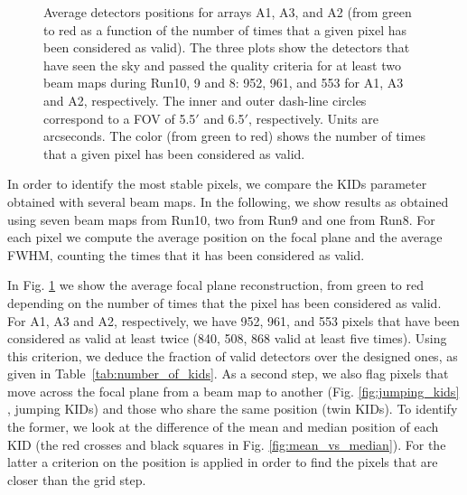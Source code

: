 \begin{figure}[p]
\begin{center}
\caption[KID selection]{Average detectors positions for arrays A1, A3, and A2 (from
  green to red as a function of the number of times that a given pixel
  has been considered as valid). The three plots show the detectors
  that have seen the sky and passed the quality criteria for at least
  two beam maps during Run10, 9 and 8: 952, 961, and 553
  for A1, A3 and A2, respectively. The inner and outer dash-line circles correspond to a 
  FOV of 5.5$\prime$ and 6.5$\prime$, respectively. Units are arcseconds. 
  The color (from green to red)  shows the number of times that a given pixel has been considered as valid.}
\label{fig:avg_fov_color}
\end{center}
\end{figure}

In order to identify the most stable pixels, we compare the KIDs parameter obtained with several beam maps. 
In the following, we show results as obtained using seven beam maps from Run10, two from Run9 and one from Run8.
For each pixel we compute the average position on the focal plane and the average FWHM, counting the times that it has been considered as valid.

In Fig. \ref{fig:avg_fov_color} we show the average focal plane
reconstruction, from green to red depending on the number of times
that the pixel has been considered as valid. For A1, A3 and A2,
respectively, we have 952, 961, and 553 pixels that have been
considered as valid at least twice (840, 508, 868 valid at least five
times).
Using this criterion, we deduce the fraction of valid
detectors over the designed ones, as given in Table~\ref{tab:number_of_kids}. 
As a second step, we also flag pixels that move across the focal plane from a 
beam map to another (Fig. \ref{fig:jumping_kids} , jumping KIDs) and those 
who share the same position (twin KIDs). To identify the former, we look at the difference 
of the mean and median position of each KID (the red crosses and black squares in 
Fig. \ref{fig:mean_vs_median}). For the latter a criterion on the position is applied in 
order to find the pixels that are closer than the grid step.



\\


